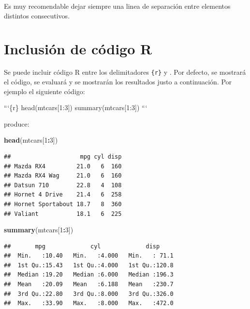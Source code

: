 \documentclass[]{book}
\newenvironment{Shaded}{\begin{snugshade}}{\end{snugshade}}
\newcommand{\KeywordTok}[1]{\textcolor[rgb]{0.13,0.29,0.53}{\textbf{#1}}}
\newcommand{\DecValTok}[1]{\textcolor[rgb]{0.00,0.00,0.81}{#1}}
\newcommand{\OperatorTok}[1]{\textcolor[rgb]{0.81,0.36,0.00}{\textbf{#1}}}
\newcommand{\NormalTok}[1]{#1}
\theoremstyle{definition}
\theoremstyle{definition}
\theoremstyle{definition}
\theoremstyle{remark}
\begin{document}
Es muy recomendable dejar siempre una linea de separación entre
elementos distintos consecutivos.

\section{Inclusión de código R}\label{codigormd}

Se puede incluir código R entre los delimitadores
\texttt{\textasciigrave{}\textasciigrave{}\textasciigrave{}\{r\}} y
\texttt{\textasciigrave{}\textasciigrave{}\textasciigrave{}}. Por
defecto, se mostrará el código, se evaluará y se mostrarán los
resultados justo a continuación. Por ejemplo el siguiente código:

\begin{Shaded}
\begin{Highlighting}[]
\NormalTok{```\{r\}}
\NormalTok{head(mtcars[1:3])}
\NormalTok{summary(mtcars[1:3])}
\NormalTok{```}
\end{Highlighting}
\end{Shaded}

produce:

\begin{Shaded}
\begin{Highlighting}[]
\KeywordTok{head}\NormalTok{(mtcars[}\DecValTok{1}\OperatorTok{:}\DecValTok{3}\NormalTok{])}
\end{Highlighting}
\end{Shaded}

\begin{verbatim}
##                    mpg cyl disp
## Mazda RX4         21.0   6  160
## Mazda RX4 Wag     21.0   6  160
## Datsun 710        22.8   4  108
## Hornet 4 Drive    21.4   6  258
## Hornet Sportabout 18.7   8  360
## Valiant           18.1   6  225
\end{verbatim}

\begin{Shaded}
\begin{Highlighting}[]
\KeywordTok{summary}\NormalTok{(mtcars[}\DecValTok{1}\OperatorTok{:}\DecValTok{3}\NormalTok{])}
\end{Highlighting}
\end{Shaded}

\begin{verbatim}
##       mpg             cyl             disp      
##  Min.   :10.40   Min.   :4.000   Min.   : 71.1  
##  1st Qu.:15.43   1st Qu.:4.000   1st Qu.:120.8  
##  Median :19.20   Median :6.000   Median :196.3  
##  Mean   :20.09   Mean   :6.188   Mean   :230.7  
##  3rd Qu.:22.80   3rd Qu.:8.000   3rd Qu.:326.0  
##  Max.   :33.90   Max.   :8.000   Max.   :472.0
\end{verbatim}
\end{document}

